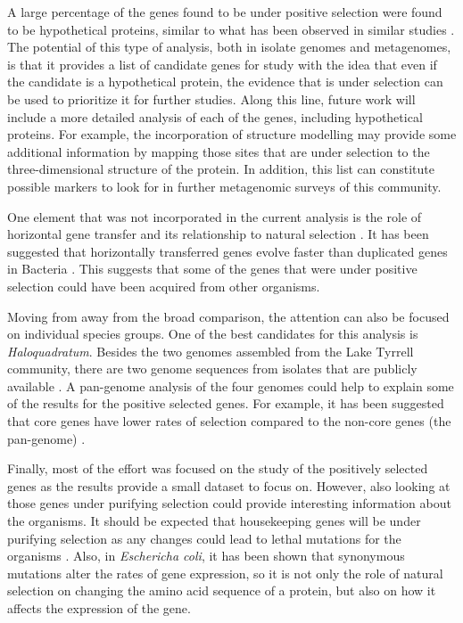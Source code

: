 A large percentage of the genes found to be under positive selection were found to be hypothetical proteins, similar to what has been observed in similar studies \cite{Tai:2011jo,Hemme:2010ds}. The potential of this type of analysis, both in isolate genomes and metagenomes, is that it provides a list of candidate genes for study with the idea that even if the candidate is a hypothetical protein, the evidence that is under selection can be used to prioritize it for further studies. Along this line, future work will include a more detailed analysis of each of the genes, including hypothetical proteins. For example, the incorporation of structure modelling may provide some additional information by mapping those sites that are under selection to the three-dimensional structure of the protein. In addition, this list can constitute possible markers to look for in further metagenomic surveys of this community.

One element that was not incorporated in the current analysis is the role of horizontal gene transfer and its relationship to natural selection \cite{Wiedenbeck:2011ena}. It has been suggested that horizontally transferred genes evolve faster than duplicated genes in Bacteria \cite{Treangen:2011ca}. This suggests that some of the genes that were under positive selection could have been acquired from other organisms.

Moving from away from the broad comparison, the attention can also be focused on individual species groups. One of the best candidates for this analysis is \textit{Haloquadratum}. Besides the two genomes assembled from the Lake Tyrrell community, there are two genome sequences from isolates that are publicly available \cite{Bolhuis:2006gm,DyallSmith:2011tu}. A pan-genome analysis of the four genomes could help to explain some of the results for the positive selected genes. For example, it has been suggested that core genes have lower rates of selection compared to the non-core genes (the pan-genome) \cite{Jordan:2002by,RodriguezValera:2012cg}.

Finally, most of the effort was focused on the study of the positively selected genes as the results provide a small dataset to focus on. However, also looking at those genes under purifying selection could provide interesting information about the organisms. It should be expected that housekeeping genes will be under purifying selection as any changes could lead to lethal mutations for the organisms \cite{Palenik:2009kx,Schloissnig:2012hx}. Also, in \textit{Eschericha coli}, it has been shown that synonymous mutations alter the rates of gene expression, so it is not only the role of natural selection on changing the amino acid sequence of a protein, but also on how it affects the expression of the gene.

